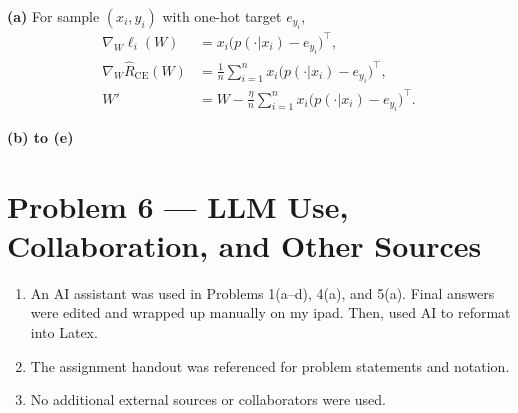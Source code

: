 \documentclass[11pt]{article}
\begin{document}
\noindent\textbf{(a)} For sample $(x_i,y_i)$ with one-hot target $e_{y_i}$,
\begin{align*}
\nabla_W \ell_i(W) &= x_i\big(p(\cdot|x_i)-e_{y_i}\big)^\top, \\
\nabla_W \hat R_{\mathrm{CE}}(W) &= \frac1n \sum_{i=1}^n x_i\big(p(\cdot|x_i)-e_{y_i}\big)^\top, \\
W' &= W - \frac{\eta}{n} \sum_{i=1}^n x_i\big(p(\cdot|x_i)-e_{y_i}\big)^\top.
\end{align*}

\noindent\textbf{(b) to (e)} 

\section*{Problem 6 --- LLM Use, Collaboration, and Other Sources}

\begin{enumerate}
\item An AI assistant was used in Problems 1(a--d), 4(a), and 5(a). Final answers were edited and wrapped up manually on my ipad. Then, used AI to reformat into Latex.
\item The assignment handout was referenced for problem statements and notation.
\item No additional external sources or collaborators were used.
\end{enumerate}
\end{document}
